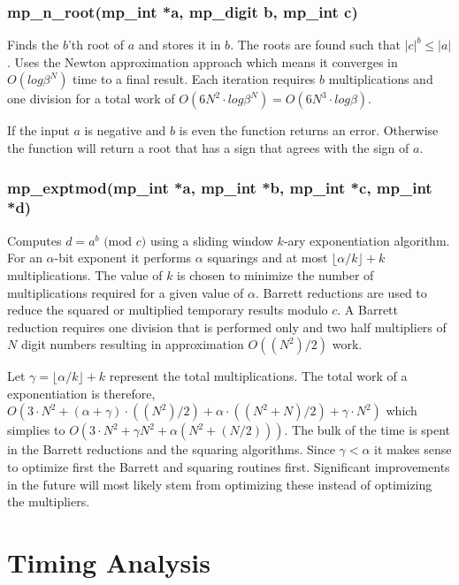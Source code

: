 \documentclass{article}
\begin{document}
\subsubsection{mp\_n\_root(mp\_int *a, mp\_digit b, mp\_int c)}
Finds the $b$'th root of $a$ and stores it in $b$.  The roots are found such that $\vert c \vert^b \le \vert a \vert$.  
Uses the Newton approximation approach which means it converges in $O(log \beta^N)$ time to a final result.  Each iteration
requires $b$ multiplications and one division for a total work of $O(6N^2 \cdot log \beta^N) = O(6N^3 \cdot log \beta)$.

If the input $a$ is negative and $b$ is even the function returns an error.  Otherwise the function will return a root
that has a sign that agrees with the sign of $a$.

\subsubsection{mp\_exptmod(mp\_int *a, mp\_int *b, mp\_int *c, mp\_int *d)}
Computes $d = a^b \mbox{ (mod }c\mbox{)}$ using a sliding window $k$-ary exponentiation algorithm.  For an $\alpha$-bit
exponent it performs $\alpha$ squarings and at most $\lfloor \alpha/k \rfloor + k$ multiplications.  The value of $k$ is
chosen to minimize the number of multiplications required for a given value of $\alpha$.  Barrett reductions are used
to reduce the squared or multiplied temporary results modulo $c$.  A Barrett reduction requires one division that is
performed only and two half multipliers of $N$ digit numbers resulting in approximation $O((N^2)/2)$ work.  

Let $\gamma = \lfloor \alpha/k \rfloor + k$ represent the total multiplications.  The total work of a exponentiation is
therefore, $O(3 \cdot N^2 + (\alpha + \gamma) \cdot ((N^2)/2) + \alpha \cdot ((N^2 + N)/2) + \gamma \cdot N^2)$ which 
simplies to $O(3 \cdot N^2 + \gamma N^2 + \alpha (N^2 + (N/2)))$.  The bulk of the time is spent in the Barrett 
reductions and the squaring algorithms.  Since $\gamma < \alpha$ it makes sense to optimize first the Barrett and
squaring routines first.  Significant improvements in the future will most likely stem from optimizing these instead
of optimizing the multipliers.

\section{Timing Analysis}
\end{document}

